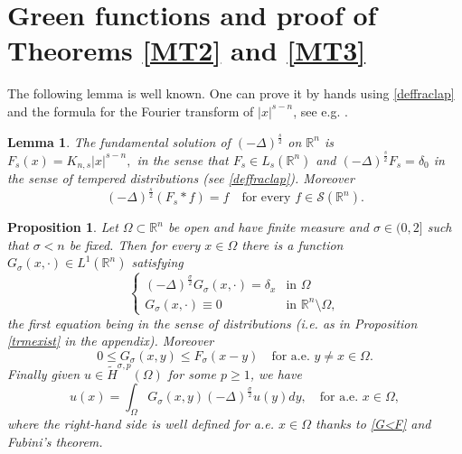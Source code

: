 \documentclass[11pt, a4paper]{article}
\newtheorem{prop}[trm]{Proposition}
\newtheorem{lemma}[trm]{Lemma}
\newcommand{\R}{\mathbb{R}}
\begin{document}
\section{Green functions and proof of Theorems \ref{MT2} and \ref{MT3}}\label{sec:2}

The following lemma is well known. One can prove it by hands using \eqref{deffraclap} and the formula for the Fourier transform of $|x|^{s-n}$, see e.g. \cite[Theorem 5.9]{LL}.

\begin{lemma}\label{green2}
The fundamental solution of $(-\Delta)^\frac{s}{2}$ on $\R^{n}$ is
$F_s(x)=K_{n,s}|x|^{s-n},$
in the sense that $F_s\in L_s (\R^n)$ and
$(-\Delta)^\frac{s}{2}F_s=\delta_0$
in the sense of tempered distributions (see \eqref{deffraclap}). Moreover
$$(-\Delta)^\frac{s}{2}(F_s* f)=f\quad \text{for every }f\in \mathcal{S}(\R^n).$$
\end{lemma}

\begin{prop}\label{propgreen}
Let $\Omega\subset\R^n$ be open and have finite measure and $\sigma\in (0,2]$ such that $\sigma<n$ be fixed. Then for every $x\in \Omega$ there is a function $G_\sigma(x,\cdot)\in L^1(\R^n)$ satisfying
\begin{equation}\label{eqgreen}
\left\{
\begin{array}{ll}
(-\Delta)^\frac{\sigma}{2} G_\sigma(x,\cdot)=\delta_x&\text{in } \Omega\\
G_\sigma(x,\cdot)\equiv 0&\text{in } \R^n\setminus \Omega,
\end{array}
\right.
\end{equation}
the first equation being in the sense of distributions (i.e. as in Proposition \ref{trmexist} in the appendix). Moreover
\begin{equation}\label{G<F}
0\le G_\sigma(x,y)\leq F_\sigma(x-y) \quad \text{for a.e. }y\ne x\in \Omega.
\end{equation}
Finally given $u\in \tilde H^{\sigma,p}(\Omega)$ for some $p\ge 1$, we have
\begin{equation}\label{eqgreenb}
u(x) = \int_\Omega G_\sigma(x,y)(-\Delta)^\frac{\sigma}{2} u(y)dy,\quad  \text{for a.e. }x\in \Omega,
\end{equation}
where the right-hand side is well defined for a.e. $x\in \Omega$ thanks to \eqref{G<F} and Fubini's theorem.
\end{prop}
\end{document}
